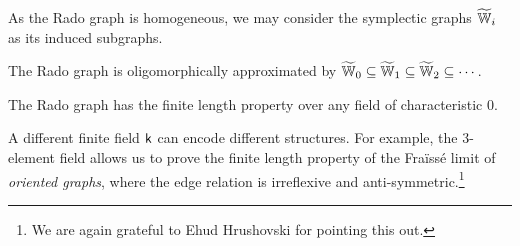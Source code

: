 As the Rado graph is homogeneous, we may consider the symplectic graphs $\widetilde {\mathbb{W}}_i$ as its induced subgraphs.
\begin{theorem} \label{thm:appendix-rado-oligo-approx}
    The Rado graph is oligomorphically approximated by $\widetilde {\mathbb{W}}_0 \subseteq \widetilde {\mathbb{W}}_1 \subseteq \widetilde {\mathbb{W}}_2 \subseteq \cdots$.
\end{theorem}

\begin{corollary}
    The Rado graph has the finite length property over any field of characteristic $0$.
\end{corollary}

A different finite field $\mathsf{k}$ can encode different structures.
For example, the 3-element field allows us to prove the finite length property of the Fraïssé limit of \emph{oriented graphs}, where the edge relation is irreflexive and anti-symmetric.\footnote{We are again grateful to Ehud Hrushovski for pointing this out.}